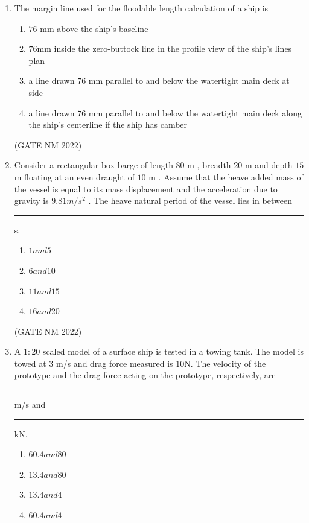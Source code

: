 \documentclass[journal,12pt,onecolumn]{IEEEtran}
\theoremstyle{remark}
\begin{document}
\begin{enumerate}
\item  The margin line used for the floodable length calculation of a ship is
\begin{enumerate}
    \item $76$ mm above the ship's baseline
    \item $76$mm inside the zero-buttock line in the profile view of the ship's lines plan
    \item a line drawn $76$ mm parallel to and below the watertight main deck at side
    \item a line drawn $76$ mm parallel to and below the watertight main deck along the ship's centerline if the ship has camber
\end{enumerate}

\hfill (GATE NM 2022)

\item  Consider a rectangular box barge of length $80$ m , breadth $20$ m  and depth $15$ m  floating at an even draught of $10$ m . Assume that the heave added mass of the vessel is equal to its mass displacement and the acceleration due to gravity is $9.81  m/s^2 $ . The heave natural period of the vessel lies in between \rule{3cm}{0.15mm} s.
	\begin{multicols}{4}
\begin{enumerate}
    \item $1 and 5$
    \item $6 and 10$
    \item $11 and 15$
    \item $16 and 20$
\end{enumerate}
	\end{multicols}

\hfill(GATE NM 2022)

\item  A $1\colon20$ scaled model of a surface ship is tested in a towing tank. The model is towed at $3$ m/s  and drag force measured is $10$N. The velocity of the prototype and the drag force acting on the prototype, respectively, are \rule{3cm}{0.15mm}  m/s and \rule{3cm}{0.15mm} kN.
	\begin{multicols}{4}
\begin{enumerate}
    \item $60.4 and 80$
    \item $13.4 and 80$
    \item $13.4 and 4$
    \item $60.4 and 4$
\end{enumerate}
	\end{multicols}


\end{enumerate}
\end{document}
